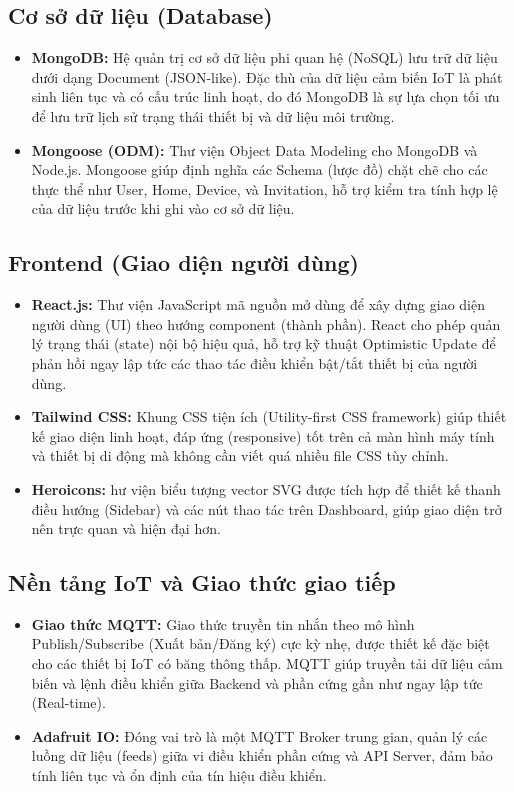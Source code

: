 \documentclass[a4paper,twoside]{article}
\begin{document}
\subsection{Cơ sở dữ liệu (Database)}
\begin{itemize}
	\item \textbf{MongoDB:} Hệ quản trị cơ sở dữ liệu phi quan hệ (NoSQL) lưu trữ dữ liệu dưới dạng Document (JSON-like). Đặc thù của dữ liệu cảm biến IoT là phát sinh liên tục và có cấu trúc linh hoạt, do đó MongoDB là sự lựa chọn tối ưu để lưu trữ lịch sử trạng thái thiết bị và dữ liệu môi trường.
	\item \textbf{Mongoose (ODM):} Thư viện Object Data Modeling cho MongoDB và Node.js. Mongoose giúp định nghĩa các Schema (lược đồ) chặt chẽ cho các thực thể như User, Home, Device, và Invitation, hỗ trợ kiểm tra tính hợp lệ của dữ liệu trước khi ghi vào cơ sở dữ liệu.
\end{itemize}

\subsection{Frontend (Giao diện người dùng)}
\begin{itemize}
	\item \textbf{React.js:} Thư viện JavaScript mã nguồn mở dùng để xây dựng giao diện người dùng (UI) theo hướng component (thành phần). React cho phép quản lý trạng thái (state) nội bộ hiệu quả, hỗ trợ kỹ thuật Optimistic Update để phản hồi ngay lập tức các thao tác điều khiển bật/tắt thiết bị của người dùng.
	\item \textbf{Tailwind CSS:} Khung CSS tiện ích (Utility-first CSS framework) giúp thiết kế giao diện linh hoạt, đáp ứng (responsive) tốt trên cả màn hình máy tính và thiết bị di động mà không cần viết quá nhiều file CSS tùy chỉnh.
	\item \textbf{Heroicons:} hư viện biểu tượng vector SVG được tích hợp để thiết kế thanh điều hướng (Sidebar) và các nút thao tác trên Dashboard, giúp giao diện trở nên trực quan và hiện đại hơn.
\end{itemize}


\subsection{Nền tảng IoT và Giao thức giao tiếp}
\begin{itemize}
	\item \textbf{Giao thức MQTT:} Giao thức truyền tin nhắn theo mô hình Publish/Subscribe (Xuất bản/Đăng ký) cực kỳ nhẹ, được thiết kế đặc biệt cho các thiết bị IoT có băng thông thấp. MQTT giúp truyền tải dữ liệu cảm biến và lệnh điều khiển giữa Backend và phần cứng gần như ngay lập tức (Real-time).
	\item \textbf{Adafruit IO:} Đóng vai trò là một MQTT Broker trung gian, quản lý các luồng dữ liệu (feeds) giữa vi điều khiển phần cứng và API Server, đảm bảo tính liên tục và ổn định của tín hiệu điều khiển.
\end{itemize}
\end{document}
